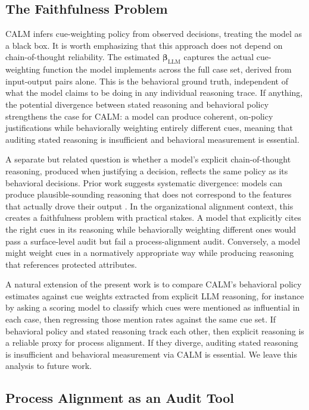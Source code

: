 \documentclass{article}
\begin{document}
\subsection{The Faithfulness Problem}

CALM infers cue-weighting policy from observed decisions, treating the model as a black box. It is worth emphasizing that this approach does not depend on chain-of-thought reliability. The estimated $\boldsymbol{\beta}_{\text{LLM}}$ captures the actual cue-weighting function the model implements across the full case set, derived from input-output pairs alone. This is the behavioral ground truth, independent of what the model claims to be doing in any individual reasoning trace. If anything, the potential divergence between stated reasoning and behavioral policy strengthens the case for CALM: a model can produce coherent, on-policy justifications while behaviorally weighting entirely different cues, meaning that auditing stated reasoning is insufficient and behavioral measurement is essential.

A separate but related question is whether a model's explicit chain-of-thought reasoning, produced when justifying a decision, reflects the same policy as its behavioral decisions. Prior work suggests systematic divergence: models can produce plausible-sounding reasoning that does not correspond to the features that actually drove their output \citep{lanham2023measuring,turpin2024language}. In the organizational alignment context, this creates a faithfulness problem with practical stakes. A model that explicitly cites the right cues in its reasoning while behaviorally weighting different ones would pass a surface-level audit but fail a process-alignment audit. Conversely, a model might weight cues in a normatively appropriate way while producing reasoning that references protected attributes.

A natural extension of the present work is to compare CALM's behavioral policy estimates against cue weights extracted from explicit LLM reasoning, for instance by asking a scoring model to classify which cues were mentioned as influential in each case, then regressing those mention rates against the same cue set. If behavioral policy and stated reasoning track each other, then explicit reasoning is a reliable proxy for process alignment. If they diverge, auditing stated reasoning is insufficient and behavioral measurement via CALM is essential. We leave this analysis to future work.

\subsection{Process Alignment as an Audit Tool}
\end{document}
